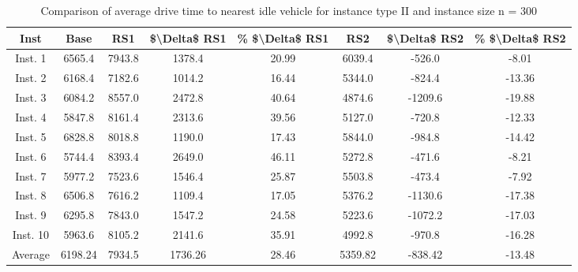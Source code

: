 \begin{table}[H]
\centering
\begin{tabular}{cccccccc}
  \hline
  \textbf{Inst} & \textbf{Base} & \textbf{RS1} & \textbf{\$\textbackslash{}Delta\$  RS1} & \textbf{\% \$\textbackslash{}Delta\$  RS1} & \textbf{RS2} & \textbf{\$\textbackslash{}Delta\$  RS2} & \textbf{\% \$\textbackslash{}Delta\$  RS2} \\\hline
  Inst. 1 & 6565.4 & 7943.8 & 1378.4 & 20.99 & 6039.4 & -526.0 & -8.01 \\
  Inst. 2 & 6168.4 & 7182.6 & 1014.2 & 16.44 & 5344.0 & -824.4 & -13.36 \\
  Inst. 3 & 6084.2 & 8557.0 & 2472.8 & 40.64 & 4874.6 & -1209.6 & -19.88 \\
  Inst. 4 & 5847.8 & 8161.4 & 2313.6 & 39.56 & 5127.0 & -720.8 & -12.33 \\
  Inst. 5 & 6828.8 & 8018.8 & 1190.0 & 17.43 & 5844.0 & -984.8 & -14.42 \\
  Inst. 6 & 5744.4 & 8393.4 & 2649.0 & 46.11 & 5272.8 & -471.6 & -8.21 \\
  Inst. 7 & 5977.2 & 7523.6 & 1546.4 & 25.87 & 5503.8 & -473.4 & -7.92 \\
  Inst. 8 & 6506.8 & 7616.2 & 1109.4 & 17.05 & 5376.2 & -1130.6 & -17.38 \\
  Inst. 9 & 6295.8 & 7843.0 & 1547.2 & 24.58 & 5223.6 & -1072.2 & -17.03 \\
  Inst. 10 & 5963.6 & 8105.2 & 2141.6 & 35.91 & 4992.8 & -970.8 & -16.28 \\
  Average & 6198.24 & 7934.5 & 1736.26 & 28.46 & 5359.82 & -838.42 & -13.48 \\\hline
\end{tabular}
\caption{Comparison of average drive time to nearest idle vehicle for instance type II and instance size n = 300}
\label{tab:wait:resrelocation-nearest-drive-time-comparison_II_300}
\end{table}
